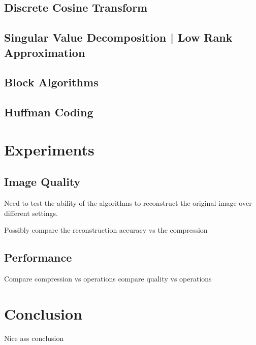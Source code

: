 \documentclass[review,onefignum,onetabnum]{siamart190516}
\begin{document}
\subsection{Discrete Cosine Transform}
\cite{ahmed1974discrete}
\lipsum[15-18]

\subsection{Singular Value Decomposition | Low Rank Approximation}
\lipsum[10-20]

\subsection{Block Algorithms}
\lipsum[21-23]

\subsection{Huffman Coding}
\lipsum[24-25]

\section{Experiments}
\subsection{Image Quality}
Need to test the ability of the algorithms to reconstruct the original image 
over different settings.

Possibly compare the reconstruction accuracy vs the compression

\lipsum[26-30]

\subsection{Performance}
Compare compression vs operations
compare quality vs operations

\lipsum[31-32]

\section{Conclusion}
Nice ass conclusion

\lipsum[33-34]

\pagebreak


\end{document}
